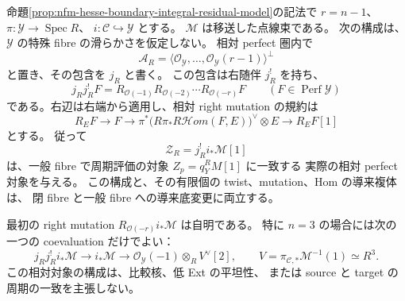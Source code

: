 \begin{proposition}[点線束から残余対象への相対右射影]
\label{prop:nfm-boundary-right-projection}
命題\ref{prop:nfm-hesse-boundary-integral-residual-model}の記法で
$r=n-1$、$\pi:\mathcal Y\to\operatorname{Spec}R$、
$i:\mathcal C\hookrightarrow\mathcal Y$ とする。
$\mathcal M$ は移送した点線束である。
次の構成は、$\mathcal Y$ の特殊 fibre の滑らかさを仮定しない。
相対 perfect 圏内で
\[
 \mathcal A_R=\langle\mathcal O_{\mathcal Y},\ldots,
              \mathcal O_{\mathcal Y}(r-1)\rangle^\perp
\]
と置き、その包含を $j_R$ と書く。
この包含は右随伴 $j_R^!$ を持ち、
\begin{equation}\label{eq:nfm-boundary-right-projection}
 j_Rj_R^!F=
 R_{\mathcal O(-1)}R_{\mathcal O(-2)}\cdots
 R_{\mathcal O(-r)}F
 \qquad(F\in\operatorname{Perf}\mathcal Y)
\end{equation}
である。右辺は右端から適用し、相対 right mutation の規約は
\[
 R_EF\longrightarrow F\longrightarrow
 \pi^*\bigl(R\pi_*R\mathcal Hom(F,E)\bigr)^\vee\otimes E
 \longrightarrow R_EF[1]
\]
とする。
従って
\[
 \mathcal Z_R=j_R^!i_*\mathcal M[1]
\]
は、一般 fibre で周期評価の対象 $Z_p=q_Y^RM[1]$ に一致する
実際の相対 perfect 対象を与える。
この構成と、その有限個の twist、mutation、Hom の導来複体は、
閉 fibre と一般 fibre への導来底変更に両立する。

最初の right mutation $R_{\mathcal O(-r)}i_*\mathcal M$ は自明である。
特に $n=3$ の場合には次の一つの coevaluation だけでよい：
\begin{equation}\label{eq:nfm-boundary-threefold-one-cone}
 j_Rj_R^!i_*\mathcal M\longrightarrow i_*\mathcal M
 \longrightarrow\mathcal O_{\mathcal Y}(-1)\otimes_R V^\vee[2],
 \qquad
 V=\pi_{\mathcal C,*}\mathcal M^{-1}(1)\simeq R^3.
\end{equation}
この相対対象の構成は、比較核、低 Ext の平坦性、
または source と target の周期の一致を主張しない。
\end{proposition}

